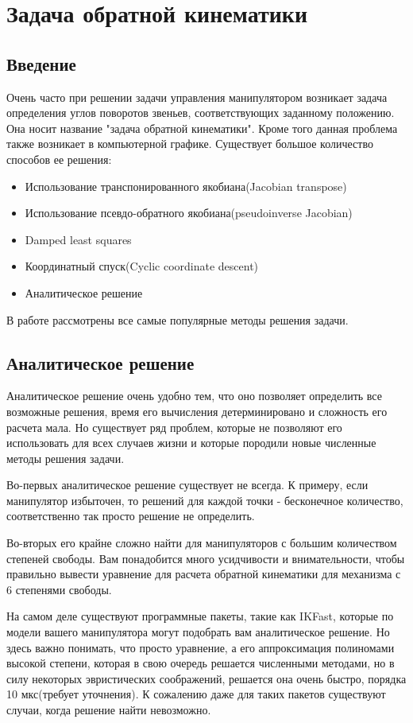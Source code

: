 \chapter{Задача обратной кинематики} \label{ch:4}


\section{Введение} \label{sect:4_1}
Очень часто при решении задачи управления манипулятором возникает задача определения углов поворотов звеньев, соответствующих заданному положению. Она носит название "задача обратной кинематики". Кроме того данная проблема также возникает в компьютерной графике. Существует большое количество способов ее решения:
\begin{itemize}
	\item Использование транспонированного якобиана(Jacobian transpose)
	\item Использование псевдо-обратного якобиана(pseudoinverse Jacobian)
	\item Damped least squares
	\item Координатный спуск(Cyclic coordinate descent)
	\item Аналитическое решение
\end{itemize}

В работе рассмотрены все самые популярные методы решения задачи.


\section{Аналитическое решение} \label{sect:4_2}
Аналитическое решение очень удобно тем, что оно позволяет определить все возможные решения, время его вычисления детерминировано и сложность его расчета мала. Но существует ряд проблем, которые не позволяют его использовать для всех случаев жизни и которые породили новые численные методы решения задачи.

Во-первых аналитическое решение существует не всегда. К примеру, если манипулятор избыточен, то решений для каждой точки - бесконечное количество, соответственно так просто решение не определить.

Во-вторых его крайне сложно найти для манипуляторов с большим количеством степеней свободы. Вам понадобится много усидчивости и внимательности, чтобы правильно вывести уравнение для расчета обратной кинематики для механизма с 6 степенями свободы.

На самом деле существуют программные пакеты, такие как IKFast, которые по модели вашего манипулятора могут подобрать вам аналитическое решение. Но здесь важно понимать, что просто уравнение, а его аппроксимация полиномами высокой степени, которая в свою очередь решается численными методами, но в силу некоторых эвристических соображений, решается она очень быстро, порядка 10 мкс(требует уточнения)\cite{IKFast}. К сожалению даже для таких пакетов существуют случаи, когда решение найти невозможно.

